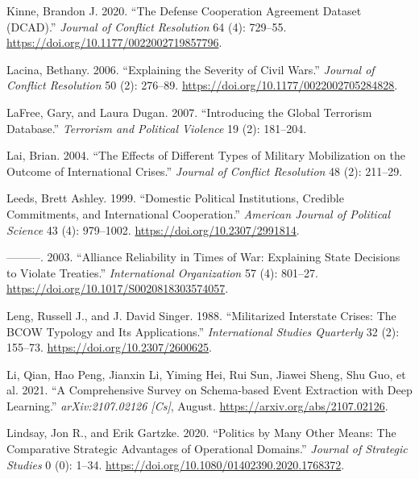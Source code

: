 \documentclass{article}
\newlength{\cslhangindent}
\newlength{\cslentryspacingunit} %
\newenvironment{CSLReferences}[2] %
 {%
  \setlength{\parindent}{0pt}
  \ifodd #1
  \let\oldpar\par
  \def\par{\hangindent=\cslhangindent\oldpar}
  \fi
  \setlength{\parskip}{#2\cslentryspacingunit}
 }%
 {}
\begin{document}
\begin{CSLReferences}{1}{0}
\leavevmode{}%
Kinne, Brandon J. 2020. {``The {Defense Cooperation Agreement Dataset}
({DCAD}).''} \emph{Journal of Conflict Resolution} 64 (4): 729--55.
\url{https://doi.org/10.1177/0022002719857796}.

\leavevmode{}%
Lacina, Bethany. 2006. {``Explaining the {Severity} of {Civil Wars}.''}
\emph{Journal of Conflict Resolution} 50 (2): 276--89.
\url{https://doi.org/10.1177/0022002705284828}.

\leavevmode{}%
LaFree, Gary, and Laura Dugan. 2007. {``Introducing the Global Terrorism
Database.''} \emph{Terrorism and Political Violence} 19 (2): 181--204.

\leavevmode{}%
Lai, Brian. 2004. {``The Effects of Different Types of Military
Mobilization on the Outcome of International Crises.''} \emph{Journal of
Conflict Resolution} 48 (2): 211--29.

\leavevmode{}%
Leeds, Brett Ashley. 1999. {``Domestic {Political Institutions},
{Credible Commitments}, and {International Cooperation}.''}
\emph{American Journal of Political Science} 43 (4): 979--1002.
\url{https://doi.org/10.2307/2991814}.

\leavevmode{}%
---------. 2003. {``Alliance {Reliability} in {Times} of {War}:
{Explaining State Decisions} to {Violate Treaties}.''}
\emph{International Organization} 57 (4): 801--27.
\url{https://doi.org/10.1017/S0020818303574057}.

\leavevmode{}%
Leng, Russell J., and J. David Singer. 1988. {``Militarized {Interstate
Crises}: {The BCOW Typology} and {Its Applications}.''}
\emph{International Studies Quarterly} 32 (2): 155--73.
\url{https://doi.org/10.2307/2600625}.

\leavevmode{}%
Li, Qian, Hao Peng, Jianxin Li, Yiming Hei, Rui Sun, Jiawei Sheng, Shu
Guo, et al. 2021. {``A {Comprehensive Survey} on {Schema-based Event
Extraction} with {Deep Learning}.''} \emph{arXiv:2107.02126 {[}Cs{]}},
August. \url{https://arxiv.org/abs/2107.02126}.

\leavevmode{}%
Lindsay, Jon R., and Erik Gartzke. 2020. {``Politics by Many Other
Means: {The} Comparative Strategic Advantages of Operational Domains.''}
\emph{Journal of Strategic Studies} 0 (0): 1--34.
\url{https://doi.org/10.1080/01402390.2020.1768372}.


\end{CSLReferences}
\end{document}
